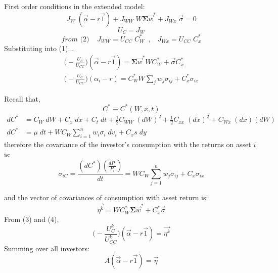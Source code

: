 \documentclass[
14pt,notheorems,hyperref={pdfauthor=whatever}
]{beamer}
\begin{document}
\begin{frame}
First order conditions in the extended model:\\
\begin{equation} \tag{1}
    J_W\;(\vec\alpha-r\vec1)+J_{WW}\;W\bm{\Sigma}\vec{w}^*+J_{Wx}\;\vec\sigma = 0
\end{equation}
\begin{equation} \tag{2}
    U_C = J_W
\end{equation}
\[ \textit{from (2)} \;\;\;\; J_{WW} = U_{CC}\;C_W^* \;\;,\;\;\; J_{Wx} = U_{CC}\;C_x^*\]
Substituting into (1)...\\
\begin{equation} \tag{3}
\begin{split}
    \bigg( -\frac{U_C}{U_{CC}} \bigg)(\vec\alpha-r\vec1) = \bm{\Sigma}\vec{w}^* W C_W^* + \vec\sigma C_x^*
    \\
    \bigg( -\frac{U_C}{U_{CC}} \bigg)(\alpha_i-r) = C_W^* W \sum_j w_j \sigma_{ij} + C_x^* \sigma_{ix}
\end{split}
\end{equation}
\end{frame}

\begin{frame}
Recall that,\\
\[ C^* \equiv C^*(W,x,t)\]
\begin{align*}
    dC^* &= C_W\;dW +C_x\;dx+C_t\;dt+\frac{1}{2}C_{WW}\;(dW)^2+\frac{1}{2}C_{xx}\;(dx)^2+C_{Wx}\;(dx)(dW)\\
    dC^* &= \mu\;dt + W C_W \sum_{i=1}^n w_i \sigma_i\; dv_i + C_x s\;dy
\end{align*}
therefore the covariance of the investor's consumption with the returns on asset $i$ is:
\[ \sigma_{iC} = \frac{(dC^*)(\frac{dP_i}{P_i})}{dt} = W C_W \sum_{j=1}^n w_j \sigma_{ij} + C_x \sigma_{ix}\]
\end{frame}

\begin{frame}
and the vector of covariances of consumption with asset return is:\\
\begin{equation} \tag{4}
    \vec{\eta^k} = W C_W^* \bm{\Sigma}\vec{w}^* + C_x^* \vec\sigma
\end{equation}
From (3) and (4),\\
\[ \bigg( -\frac{U_C^k}{U_{CC}^k} \bigg)(\vec\alpha-r\vec1) = \vec{\eta^k}\]
Summing over all investors:
\begin{equation} \tag{5}
    A(\vec\alpha-r\vec1) = \vec{\eta}
\end{equation}
\end{frame}
\end{document}
